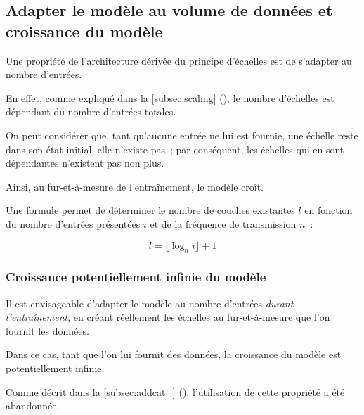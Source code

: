{\subsection{Adapter le modèle au volume de données et croissance du modèle}
Une propriété de l'architecture dérivée du principe d'échelles est de s'adapter au nombre d'entrées.

En effet, comme expliqué dans la \autoref{subsec:scaling} (), le nombre d'échelles est dépendant du nombre d'entrées totales. 

On peut considérer que, tant qu'aucune entrée ne lui est fournie, une échelle reste dans son état initial, elle n'\og existe\fg{} pas~; par conséquent, les échelles qui en sont dépendantes n'existent pas non plus.

Ainsi, au fur-et-à-mesure de l'entraînement, le modèle croît.

Une formule permet de déterminer le nombre de couches \og existantes\fg{} $l$ en fonction du nombre d'entrées présentées $i$ et de la fréquence de transmission $n$~:

\[l = \lfloor\log_n i\rfloor + 1\]\label{growth_formula}

\subsubsection{Croissance potentiellement infinie du modèle}\label{inf_growth}
Il est envisageable d'adapter le modèle au nombre d'entrées \textit{durant l'entraînement}, en créant réellement les échelles au fur-et-à-mesure que l’on fournit les données.

Dans ce cas, tant que l'on lui fournit des données, la croissance du modèle est potentiellement infinie.

Comme décrit dans la \autoref{subsec:addcat_} (), l'utilisation de cette propriété a été abandonnée.

%
%	
}